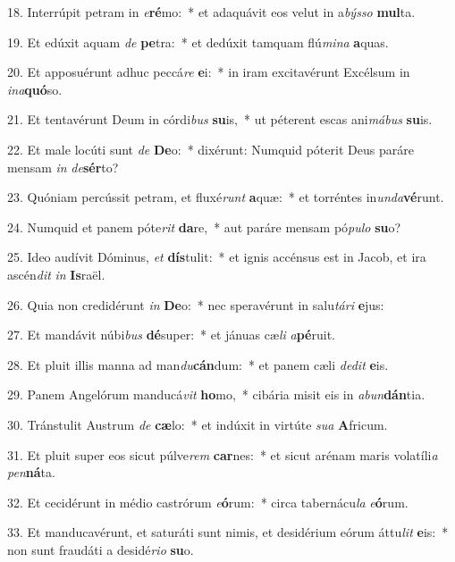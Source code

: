 18. Interrúpit petram in \textit{e}\textbf{ré}mo:~*  et adaquávit eos velut in a\textit{býs}\textit{so} \textbf{mul}ta.\

19. Et edúxit aquam \textit{de} \textbf{pe}tra:~*  et dedúxit tamquam flú\textit{mi}\textit{na} \textbf{a}quas.\

20. Et apposuérunt adhuc peccá\textit{re} \textbf{e}i:~*  in iram excitavérunt Excélsum in \textit{in}\textit{a}\textbf{quó}so.\

21. Et tentavérunt Deum in córdi\textit{bus} \textbf{su}is,~*  ut péterent escas ani\textit{má}\textit{bus} \textbf{su}is.\

22. Et male locúti sunt \textit{de} \textbf{De}o:~*  dixérunt: Numquid póterit Deus paráre mensam \textit{in} \textit{de}\textbf{sér}to?\

23. Quóniam percússit petram, et fluxé\textit{runt} \textbf{a}quæ:~*  et torréntes in\textit{un}\textit{da}\textbf{vé}runt.\

24. Numquid et panem póte\textit{rit} \textbf{da}re,~*  aut paráre mensam pó\textit{pu}\textit{lo} \textbf{su}o?\

25. Ideo audívit Dóminus, \textit{et} \textbf{dís}tulit:~*  et ignis accénsus est in Jacob, et ira ascén\textit{dit} \textit{in} \textbf{Is}raël.\

26. Quia non credidérunt \textit{in} \textbf{De}o:~*  nec speravérunt in salu\textit{tá}\textit{ri} \textbf{e}jus:\

27. Et mandávit núbi\textit{bus} \textbf{dé}super:~*  et jánuas cæ\textit{li} \textit{a}\textbf{pé}ruit.\

28. Et pluit illis manna ad man\textit{du}\textbf{cán}dum:~*  et panem cæli \textit{de}\textit{dit} \textbf{e}is.\

29. Panem Angelórum manducá\textit{vit} \textbf{ho}mo,~*  cibária misit eis in \textit{ab}\textit{un}\textbf{dán}tia.\

30. Tránstulit Austrum \textit{de} \textbf{cæ}lo:~*  et indúxit in virtúte \textit{su}\textit{a} \textbf{A}fricum.\

31. Et pluit super eos sicut púlve\textit{rem} \textbf{car}nes:~*  et sicut arénam maris volatíli\textit{a} \textit{pen}\textbf{ná}ta.\

32. Et cecidérunt in médio castrórum \textit{e}\textbf{ó}rum:~*  circa tabernácu\textit{la} \textit{e}\textbf{ó}rum.\

33. Et manducavérunt, et saturáti sunt nimis, et desidérium eórum áttu\textit{lit} \textbf{e}is:~*  non sunt fraudáti a desidé\textit{ri}\textit{o} \textbf{su}o.\

